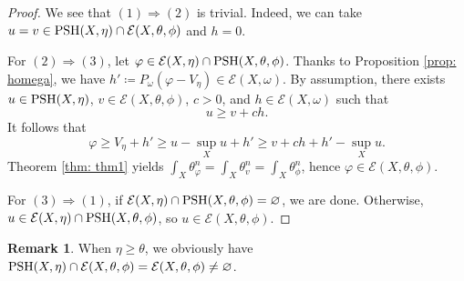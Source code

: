 \documentclass[a4paper]{amsart}
\numberwithin{equation}{section}
\theoremstyle{definition}
\newtheorem{remark}[theorem]{Remark}
\numberwithin{equation}{section}
\newcommand{\PSH}{{\rm PSH}}
\begin{document}
\begin{proof}
 We see that $(1)\Rightarrow (2)$ is trivial. Indeed, we can take $u=v\in \PSH(X,\eta)\cap\mathcal{E}(X,\theta,\phi)$ and $h=0$.

For $(2)\Rightarrow (3)$, let $\varphi\in \mathcal{E}(X,\eta)\cap \PSH(X,\theta,\phi)$. Thanks to Proposition \ref{prop: homega}, we have $h'\coloneqq P_\omega(\varphi-V_\eta)\in\mathcal{E}(X,\omega)$. By assumption, there exists $u\in\PSH(X,\eta)$, $v\in\mathcal{E}(X,\theta,\phi)$, $c>0$, and $h\in\mathcal{E}(X,\omega)$ such that \[u\geq v+ ch. \]
 It follows that 
 \[\varphi\geq V_\eta+h'\geq u-\sup_X u+h'\geq v+ch+h'-\sup_X u. \]
 Theorem \ref{thm: thm1} yields $\int_X\theta_\varphi^n=\int_X\theta^n_v=\int_X\theta_\phi^n$, hence $\varphi\in\mathcal{E}(X,\theta,\phi)$.

 For $(3)\Rightarrow (1)$, if $\mathcal{E}(X,\eta)\cap\PSH(X,\theta,\phi)=\varnothing$, we are done. Otherwise, $u\in \mathcal{E}(X,\eta)\cap\PSH(X,\theta,\phi)$, so $u\in\mathcal{E}(X,\theta,\phi)$. 
\end{proof}
\begin{remark}
When $\eta\geq \theta$, we obviously have $\PSH(X,\eta)\cap\mathcal{E}(X,\theta,\phi)=\mathcal{E}(X,\theta,\phi)\neq \varnothing$. 
\end{remark}



\end{document}

